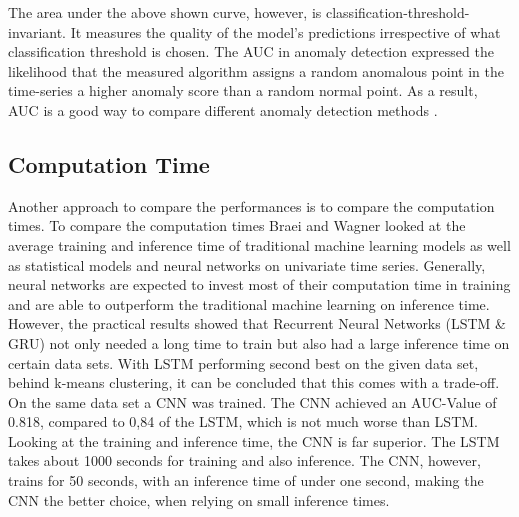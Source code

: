 The area under the above shown curve, however, is classification-threshold-invariant. It measures the quality of the model's predictions irrespective of what classification threshold is chosen. The AUC in anomaly detection expressed the likelihood that the measured algorithm assigns a random anomalous point in the time-series a higher anomaly score than a random normal point. As a result, AUC is a good way to compare different anomaly detection methods \parencite{Braei2020}.

%
%
%
%


\subsection{Computation Time}
Another approach to compare the performances is to compare the computation times. To compare the computation times Braei and Wagner \parencite*{Braei2020} looked at the average training and inference time of traditional machine learning models as well as  statistical models and neural networks on univariate time series. Generally, neural networks are expected to invest most of their computation time in training and are able to outperform the traditional machine learning on inference time. However, the practical results showed that Recurrent Neural Networks (LSTM \& GRU) not only needed a long time to train but also had a large inference time on certain data sets. With LSTM performing second best on the given data set, behind k-means clustering, it can be concluded that this comes with a trade-off. On the same data set a CNN was trained. The CNN achieved an AUC-Value of 0.818, compared to 0,84 of the LSTM, which is not much worse than LSTM. Looking at the training and inference time, the CNN is far superior. The LSTM takes about 1000 seconds for training and also inference. The CNN, however, trains for 50 seconds, with an inference time of under one second, making the CNN the better choice, when relying on small inference times.

